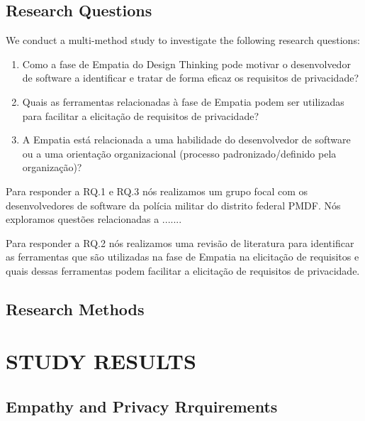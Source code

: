 \documentclass[conference]{IEEEtran}
\begin{document}
\subsection{Research Questions}
\label{rq}  

We conduct a multi-method study to investigate the following research questions:

\begin{enumerate}[RQ.1:]
    \item Como a fase de Empatia do Design Thinking pode motivar o desenvolvedor de software a identificar e tratar de forma eficaz os requisitos de privacidade?
    \item Quais as ferramentas relacionadas à fase de Empatia podem ser utilizadas para facilitar a elicitação de requisitos de privacidade? 
    \item A Empatia está relacionada a uma habilidade do desenvolvedor de software ou a uma orientação organizacional (processo padronizado/definido pela organização)?

\end{enumerate}

Para responder a RQ.1 e RQ.3 nós realizamos um grupo focal com os desenvolvedores de software da polícia militar do distrito federal PMDF. Nós exploramos questões relacionadas a .......

Para responder a RQ.2 nós realizamos uma revisão de literatura para identificar as ferramentas que são utilizadas na fase de Empatia na elicitação de requisitos e quais dessas ferramentas podem facilitar a elicitação de requisitos de privacidade.

\subsection{Research Methods}


\section{STUDY RESULTS}
\label{empathy}

\subsection{Empathy and Privacy Rrquirements}

\end{document}
